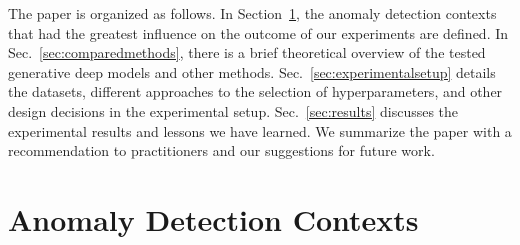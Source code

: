 The paper is organized as follows. In Section~\ref{sec:contexts}, the anomaly detection contexts that had the greatest influence on the outcome of our experiments are defined. In Sec.~\ref{sec:comparedmethods}, there is a brief theoretical overview of the tested generative deep models and other methods. Sec.~\ref{sec:experimentalsetup} details the datasets,  different approaches to the selection of hyperparameters, and other design decisions in the experimental setup. Sec.~\ref{sec:results} discusses the experimental results and lessons we have learned. We summarize the paper with a recommendation to practitioners and our suggestions for future work.

\section{Anomaly Detection Contexts}
\label{sec:contexts}
